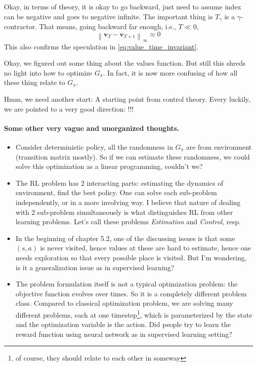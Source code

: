\documentclass[11pt,a4paper]{article}
\def\blue{\color{blue}}
\newcommand{\norm}[1]{\left\lVert#1\right\rVert}
\theoremstyle{definition}
\theoremstyle{remark}
\begin{document}
Okay, in terms of theory, it is okay to go backward, just need to assume index can be negative and goes to negative infinite. The important thing is $T_{\gamma}$ is a $\gamma$-contractor. That means, going backward far enough, i.e.,  $T \ll 0$, 
\[
\norm{\bm{v}_{T} - \bm{v}_{T+1}}_{\infty} \approx 0
\] 
This also confirms the speculation in \eqref{eq:value_time_invariant}.

Okay, we figured out some thing about the values function. But still this shreds no light into how to optimize $G_\pi$. In fact, it is now more confusing of how all these thing relate to $G_\pi$.

Hmm, we need another start: A starting point from control theory.
Every luckily, we are pointed to a very good direction: \parencite{bertsekas2012dynamic} !!!

\paragraph{Some other very vague and unorganized thoughts.}%
\begin{itemize}
    \item 
Consider deterministic policy, all the randomness in $G_{\pi}$ are from environment (transition matrix mostly). So if we can estimate these randomness, we could solve this optimization as a linear programming, couldn't we?
\item The RL problem has 2 interacting parts: estimating the dynamics of environment, find the best policy. One can solve each sub-problem independently, or in a more involving way. I believe that nature of dealing with 2 sub-problem simultaneously is what distinguishes RL from other learning problems. Let's call these problems \textit{Estimation} and \textit{Control}, resp.
\item 
{\blue In the beginning of chapter 5.2, one of the discussing issues is that some $(s,a)$ is never visited, hence values at these are hard to estimate, hence one needs exploration so that every possible place is visited. But I'm wondering, is it a generalization issue as in supervised learning?}
\item 
The problem formulation itself is not a typical optimization problem: the objective function evolves over times. So it is a completely different problem class. Compared to classical optimization problem, we are solving many different problems, each at one timestep\footnote{of course, they should relate to each other in someway}, which is parameterized by the state and the optimization variable is the action.
{\blue Did people try to learn the reward function using neural network as in supervised learning setting?}
\end{itemize}
\end{document}
